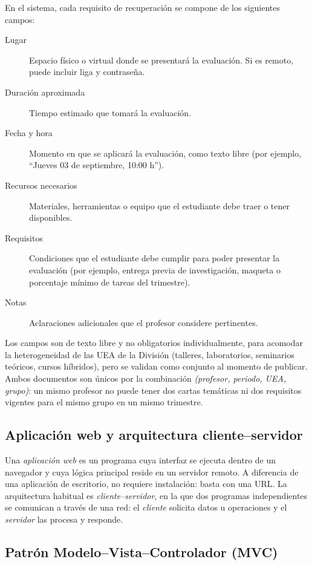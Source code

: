En el sistema, cada requisito de recuperación se compone de los siguientes campos:

\begin{description}
    \item[Lugar] Espacio físico o virtual donde se presentará la evaluación. Si es remoto, puede incluir liga y contraseña.
    \item[Duración aproximada] Tiempo estimado que tomará la evaluación.
    \item[Fecha y hora] Momento en que se aplicará la evaluación, como texto libre (por ejemplo, ``Jueves 03 de septiembre, 10:00 h'').
    \item[Recursos necesarios] Materiales, herramientas o equipo que el estudiante debe traer o tener disponibles.
    \item[Requisitos] Condiciones que el estudiante debe cumplir para poder presentar la evaluación (por ejemplo, entrega previa de investigación, maqueta o porcentaje mínimo de tareas del trimestre).
    \item[Notas] Aclaraciones adicionales que el profesor considere pertinentes.
\end{description}

Los campos son de texto libre y no obligatorios individualmente, para acomodar la heterogeneidad de las UEA de la División (talleres, laboratorios, seminarios teóricos, cursos híbridos), pero se validan como conjunto al momento de publicar. Ambos documentos son únicos por la combinación \emph{(profesor, periodo, UEA, grupo)}: un mismo profesor no puede tener dos cartas temáticas ni dos requisitos vigentes para el mismo grupo en un mismo trimestre.

\subsection{Aplicación web y arquitectura cliente--servidor}

Una \emph{aplicación web} es un programa cuya interfaz se ejecuta dentro de un navegador y cuya lógica principal reside en un servidor remoto. A diferencia de una aplicación de escritorio, no requiere instalación: basta con una URL. La arquitectura habitual es \emph{cliente--servidor}, en la que dos programas independientes se comunican a través de una red: el \emph{cliente} solicita datos u operaciones y el \emph{servidor} las procesa y responde.

\subsection{Patrón Modelo--Vista--Controlador (MVC)}


